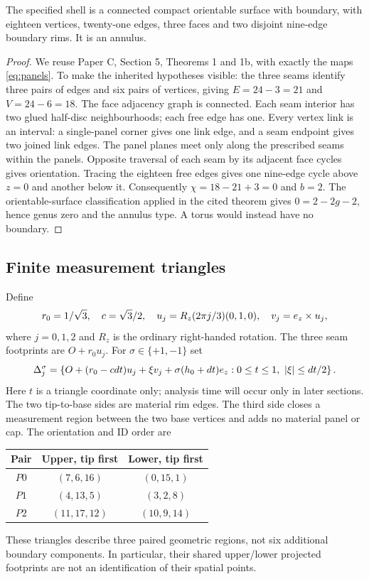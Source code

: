 \begin{proposition}\label{prop:topology}
The specified shell is a connected compact orientable surface with boundary, with eighteen vertices, twenty-one edges, three faces and two disjoint nine-edge boundary rims. It is an annulus.
\end{proposition}
\begin{proof}
We reuse Paper C, Section 5, Theorems 1 and 1b, with exactly the maps \eqref{eq:panels}. To make the inherited hypotheses visible: the three seams identify three pairs of edges and six pairs of vertices, giving $E=24-3=21$ and $V=24-6=18$. The face adjacency graph is connected. Each seam interior has two glued half-disc neighbourhoods; each free edge has one. Every vertex link is an interval: a single-panel corner gives one link edge, and a seam endpoint gives two joined link edges. The panel planes meet only along the prescribed seams within the panels. Opposite traversal of each seam by its adjacent face cycles gives orientation. Tracing the eighteen free edges gives one nine-edge cycle above $z=0$ and another below it. Consequently $\chi=18-21+3=0$ and $b=2$. The orientable-surface classification applied in the cited theorem gives $0=2-2g-2$, hence genus zero and the annulus type. A torus would instead have no boundary.
\end{proof}

\subsection{Finite measurement triangles}
Define
\begin{equation}\label{eq:axes}
r_0=1/\sqrt3,\quad c=\sqrt3/2,\quad
u_j=R_z(2\pi j/3)(0,1,0),\quad v_j=e_z\times u_j,
\end{equation}
where $j=0,1,2$ and $R_z$ is the ordinary right-handed rotation. The three seam footprints are $O+r_0u_j$. For $\sigma\in\{+1,-1\}$ set
\begin{equation}\label{eq:triangles}
\Delta_j^\sigma=\left\{O+(r_0-cdt)u_j+\xi v_j+\sigma(h_0+dt)e_z:
0\le t\le1,\ |\xi|\le dt/2\right\}.
\end{equation}
Here $t$ is a triangle coordinate only; analysis time will occur only in later sections. The two tip-to-base sides are material rim edges. The third side closes a measurement region between the two base vertices and adds no material panel or cap. The orientation and ID order are
\begin{center}
\begin{tabular}{@{}ccc@{}}\toprule
Pair & Upper, tip first & Lower, tip first\\\midrule
$P0$ & $(7,6,16)$ & $(0,15,1)$\\
$P1$ & $(4,13,5)$ & $(3,2,8)$\\
$P2$ & $(11,17,12)$ & $(10,9,14)$\\\bottomrule
\end{tabular}
\end{center}
These triangles describe three paired geometric regions, not six additional boundary components. In particular, their shared upper/lower projected footprints are not an identification of their spatial points.

